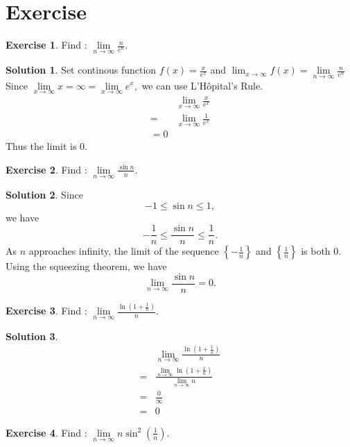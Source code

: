 \documentclass{article}
\theoremstyle{definition}
\newtheorem{exe}{Exercise}[section]
\newtheorem{sol}{Solution}[exe]
\begin{document}
\newpage
\section{Exercise}


\begin{exe}
Find : $\underset{n \to \infty}{\lim}\frac{n}{e^{n}}.$ 
\end{exe}
\begin{sol}
    Set continous function $f(x)=\frac{x}{e^{x}}$ and $\lim_{x\to \infty}f(x)=\underset{n \to \infty}{\lim}\frac{n}{e^{n}}$
Since $\underset{x \to \infty}{\lim}x=\infty=\underset{x \to \infty}{\lim}e^{x},$ we can use L'Hôpital's Rule.
\begin{align*}
    &\underset{x \to \infty}{\lim}\frac{x}{e^{x}}\\
    =& \underset{x \to \infty}{\lim}\frac{1}{e^{x}}\\
    =0
\end{align*}
Thus the limit is $0$.
\end{sol}

\begin{exe}
Find : $\underset{n \to \infty}{\lim}\frac{\sin{n}}{n}.$
\end{exe}

\begin{sol}
    Since $$-1\leq \sin{n}\leq 1,$$ we have $$-\frac{1}{n}\leq \frac{\sin{n}}{n}\leq \frac{1}{n}.$$
    As $n$ approaches infinity, the limit of the sequence $\left\{-\frac{1}{n}\right\}$ and $\left\{\frac{1}{n}\right\}$ is both $0$. Using the squeezing theorem, we have $$\underset{n \to \infty}{\lim}\frac{\sin{n}}{n}=0.$$
\end{sol}

\begin{exe}
    Find : $\underset{n \to \infty}{\lim}\frac{\ln(1+\frac{1}{n})}{n}.$
\end{exe}
\begin{sol}
\begin{align*}
    &\underset{n \to \infty}{\lim}\frac{\ln(1+\frac{1}{n})}{n}\\
    =& \frac{\underset{n \to \infty}{\lim} \ln(1+\frac{1}{n})}{\underset{n \to \infty}{\lim} n}\\
    =&\frac{0}{\infty}\\
    =&0	
\end{align*}
\end{sol}

\begin{exe}
    Find : $\underset{n \to \infty}{\lim}n\sin^{2}(\frac{1}{n}).$
\end{exe}
\end{document}
